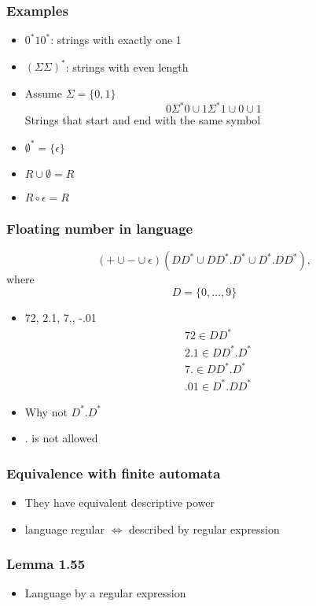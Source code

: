 \begin{frame}[allowframebreaks] \frametitle{Examples}
  \begin{itemize}  
\item $0^*10^*$: strings with exactly one 1 
\item $(\Sigma \Sigma)^*$: strings with even length
\item Assume $\Sigma = \{0,1\}$
  \begin{equation*}
0 \Sigma^*0 \cup 1 \Sigma^*1\cup 0 \cup 1
\end{equation*}
Strings that start
and end with the same symbol
\item $\emptyset^*=\{\epsilon\}$
\item $R\cup \emptyset=R$
\item $R \circ \epsilon=R$
\end{itemize}\end{frame} \begin{frame}[allowframebreaks] \frametitle{Floating number in language}
\begin{equation*}
  (+\cup-\cup\epsilon)(
DD^*\cup DD^*.D^*\cup D^*.DD^*),
\end{equation*}
where
\begin{equation*}
  D = \{0, \ldots,9\}
\end{equation*}
  \begin{itemize}
\item 72, 2.1, 7., -.01
  \begin{equation*}
    \begin{split}
      & 72 \in DD^*\\
      & 2.1 \in DD^*.D^*\\
      &  7. \in DD^*.D^*\\
      & .01 \in D^*.DD^*
    \end{split}
  \end{equation*}

\item Why not $D^*.D^*$

\item [] . is not allowed

\end{itemize}\end{frame} \begin{frame}[allowframebreaks] \frametitle{Equivalence with finite automata}
  \begin{itemize}
\item They have equivalent descriptive power
\item language regular
$\Leftrightarrow$ described by regular expression
\end{itemize}\end{frame} \begin{frame}[allowframebreaks] \frametitle{Lemma 1.55}
  \begin{itemize}
\item Language by a regular expression


\end{itemize}
\end{frame}
